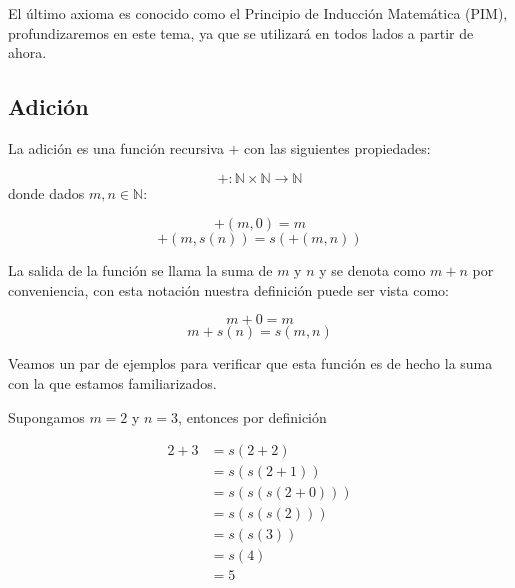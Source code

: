 \documentclass{report}
\begin{document}
    El último axioma es conocido como el Principio de Inducción Matemática (PIM), profundizaremos en este tema, ya que se utilizará en todos lados a partir de ahora.

    \subsection*{Adición}

    La adición es una función recursiva $+$ con las siguientes propiedades:

    $$+: \mathbb{N}\times \mathbb{N} \to \mathbb{N}$$ donde dados $m,n \in \mathbb{N}$:

    $$+(m,0) = m$$
    $$+(m,s(n)) = s(+(m,n))$$

    La salida de la función se llama la suma de $m$ y $n$ y se denota como $m+n$ por conveniencia, con esta notación nuestra definición puede ser vista como:

    $$m+0 = m$$
    $$m + s(n) = s(m, n)$$

    Veamos un par de ejemplos para verificar que esta función es de hecho la suma con la que estamos familiarizados.

    \begin{Example}
        Supongamos $m=2$ y $n=3$, entonces por definición

        \begin{align*}
            2+3 &= s(2+2)\\
            &= s(s(2+1))\\
            &= s(s(s(2+0)))\\
            &= s(s(s(2)))\\
            &= s(s(3))\\
            &= s(4)\\
            &= 5
        \end{align*}
    \end{Example}
\end{document}
